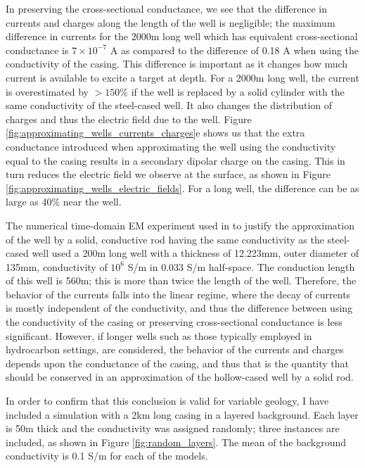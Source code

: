 In preserving the cross-sectional conductance, we see that the difference in currents and charges along the length of the well is negligible;  the maximum difference in currents for the 2000m long well which has equivalent cross-sectional conductance is $7\times10^{-7}$ A as compared to the difference of 0.18 A when using the conductivity of the casing. This difference is important as it changes how much current is available to excite a target at depth. For a 2000m long well, the current is overestimated by $> 150\%$ if the well is replaced by a solid cylinder with the same conductivity of the steel-cased well. It also changes the distribution of charges and thus the electric field due to the well. Figure \ref{fig:approximating_wells_currents_charges}e shows us that the extra conductance introduced when approximating the well using the conductivity equal to the casing results in a secondary dipolar charge on the casing. This in turn reduces the electric field we observe at the surface, as shown in Figure \ref{fig:approximating_wells_electric_fields}. For a long well, the difference can be as large as 40\% near the well.



The numerical time-domain EM experiment used in \cite{Um2015} to justify the approximation of the well by a solid, conductive rod having the same conductivity as the steel-cased well used a 200m long well with a thickness of 12.223mm, outer diameter of 135mm, conductivity of $10^{6}$ S/m in 0.033 S/m half-space. The conduction length of this well is 560m; this is more than twice the length of the well. Therefore, the behavior of the currents falls into the linear regime, where the decay of currents is mostly independent of the conductivity, and thus the difference between using the conductivity of the casing or preserving cross-sectional conductance is less significant. However, if longer wells such as those typically employed in hydrocarbon settings, are considered, the behavior of the currents and charges depends upon the conductance of the casing, and thus that is the quantity that should be conserved in an approximation of the hollow-cased well by a solid rod.

In order to confirm that this conclusion is valid for variable geology, I have included a simulation with a 2km long casing in a layered background. Each layer is 50m thick and the conductivity was assigned randomly; three instances are included, as shown in Figure \ref{fig:random_layers}. The mean of the background conductivity is 0.1 S/m for each of the models.

